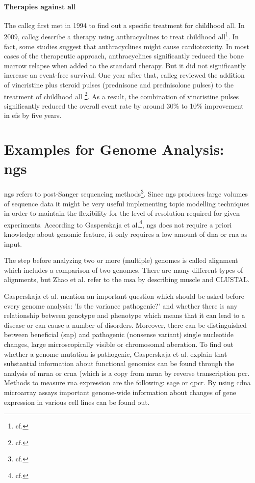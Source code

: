 \paragraph{Therapies against \gls{all}}
The \gls{callcg} first met in 1994 to find out a specific treatment for childhood \gls{all}.
In 2009, \gls{callcg} describe a therapy using anthracyclines to treat childhood \gls{all}\footnote{cf.\autocite{callcg_2009}}. In fact, some studies suggest that anthracyclines might cause cardiotoxicity. In most cases of the therapeutic approach, anthracyclines significantly reduced the bone marrow relapse when added to the standard therapy. But it did not significantly increase an event-free survival.
One year after that, \gls{callcg} reviewed the addition of vincristine plus steroid pulses (prednisone and prednisolone pulses) to the treatment of childhood \gls{all} \footnote{cf.\autocite{callcg_2010}}. As a result, the combination of vincristine pulses significantly reduced the overall event rate by around 30\% to 10\% improvement in \gls{efs} by  five years.

\section{Examples for Genome Analysis: \gls{ngs}}\label{genome_analysis}
\gls{ngs} refers to post-Sanger sequencing methods\footnote{cf.\autocite{zhao_2016}}. Since \gls{ngs} produces large volumes of sequence data it might be very useful implementing topic modelling techniques in order to maintain the flexibility for the level of resolution required for given experiments.  
According to Gasperskaja et al.\footnote{cf.\autocite{gasperskaja_2017}}, \gls{ngs} does not require a priori knowledge about genomic feature, it only requires a low amount of \gls{dna} or \gls{rna} as input.

The step before analyzing two or more (multiple) genomes is called alignment which includes a comparison of two genomes. There are many different types of alignments, but Zhao et al. refer to the \gls{msa} by describing \gls{muscle} and CLUSTAL.

Gasperskaja et al. mention an important question which should be asked before every genome analysis: 'Is the variance pathogenic?' and whether there is any relationship between genotype and phenotype which means that it can lead to a disease or can cause a number of disorders. 
Moreover, there can be distinguished between beneficial (\gls{snp}) and pathogenic (nonsense variant) single nucleotide changes, large microscopically visible or chromosomal aberation. 
To find out whether a genome mutation is pathogenic, Gasperskaja et al. explain that substantial information about functional genomics can be found through the analysis of \gls{mrna} or \gls{crna} (which is a copy from \gls{mrna} by reverse transcription \gls{pcr}.
Methods to measure \gls{rna} expression are the following: \gls{sage} or \gls{qpcr}.
By using \gls{cdna} microarray assays important genome-wide information about changes of gene expression in various cell lines can be found out.

